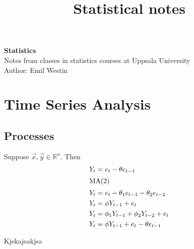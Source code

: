 \documentclass[11pt]{article}
\begin{document}
\title{Statistical notes}

\thispagestyle{empty}

\begin{center}
{\LARGE \bf Statistics}\\
Notes from classes in statistics courses at Uppsala University \\
Author: Emil Westin
\end{center}

\section{Time Series Analysis}
\subsection{Processes}

Suppose $\vec{x},\vec{y} \in \mathbb{R}^n$. Then 
\begin{align}

Y_t & = e_t - \theta e_{t-1} \label{MA1} \\
\intertext{MA(2)}
Y_t & = e_t - \theta_1 e_{t-1} -  \theta_2 e_{t-2} \label{MA2} \\
Y_t & = \phi Y_{t-1} + e_t \label{AR1} \\
Y_t & = \phi_1 Y_{t-1} + \phi_2 Y_{t-2} + e_t \label{AR2} \\
Y_t & = \phi Y_{t-1} + e_t - \theta e_{t-1} \label{ARMA} 
\end{align}

Kjskajsakjsa
\end{document}
